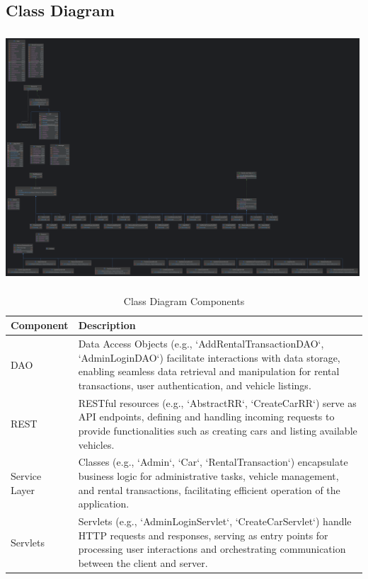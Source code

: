 \subsection{Class Diagram}

\includegraphics[width=500, height=350]{wa2324-homework-template/FinalClassDiagam.png}

\begin{table}[htbp]
    \centering
    \begin{tabular}{|p{3cm}|p{10cm}|}
    \hline
    \textbf{Component} & \textbf{Description} \\
    \hline
    DAO & Data Access Objects (e.g., `AddRentalTransactionDAO`, `AdminLoginDAO`) facilitate interactions with data storage, enabling seamless data retrieval and manipulation for rental transactions, user authentication, and vehicle listings. \\
    REST & RESTful resources (e.g., `AbstractRR`, `CreateCarRR`) serve as API endpoints, defining and handling incoming requests to provide functionalities such as creating cars and listing available vehicles. \\
    Service Layer & Classes (e.g., `Admin`, `Car`, `RentalTransaction`) encapsulate business logic for administrative tasks, vehicle management, and rental transactions, facilitating efficient operation of the application. \\
    Servlets & Servlets (e.g., `AdminLoginServlet`, `CreateCarServlet`) handle HTTP requests and responses, serving as entry points for processing user interactions and orchestrating communication between the client and server. \\
    \hline
    \end{tabular}
    \caption{Class Diagram Components}
    \label{tab:class-diagram}
\end{table}
